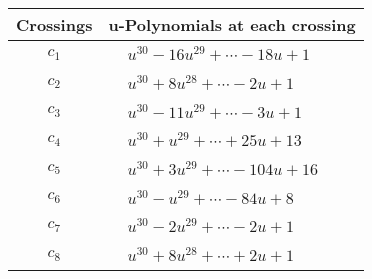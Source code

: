 \documentclass[1p]{elsarticle_modified}
\theoremstyle{definition}
\begin{document}
\begin{tabular}{m{50pt}|m{274pt}}
Crossings & \hspace{64pt}u-Polynomials at each crossing \\
\hline $$\begin{aligned}c_{1}\end{aligned}$$&$\begin{aligned}
&u^{30}-16 u^{29}+\cdots-18 u+1
\end{aligned}$\\
\hline $$\begin{aligned}c_{2}\end{aligned}$$&$\begin{aligned}
&u^{30}+8 u^{28}+\cdots-2 u+1
\end{aligned}$\\
\hline $$\begin{aligned}c_{3}\end{aligned}$$&$\begin{aligned}
&u^{30}-11 u^{29}+\cdots-3 u+1
\end{aligned}$\\
\hline $$\begin{aligned}c_{4}\end{aligned}$$&$\begin{aligned}
&u^{30}+u^{29}+\cdots+25 u+13
\end{aligned}$\\
\hline $$\begin{aligned}c_{5}\end{aligned}$$&$\begin{aligned}
&u^{30}+3 u^{29}+\cdots-104 u+16
\end{aligned}$\\
\hline $$\begin{aligned}c_{6}\end{aligned}$$&$\begin{aligned}
&u^{30}- u^{29}+\cdots-84 u+8
\end{aligned}$\\
\hline $$\begin{aligned}c_{7}\end{aligned}$$&$\begin{aligned}
&u^{30}-2 u^{29}+\cdots-2 u+1
\end{aligned}$\\
\hline $$\begin{aligned}c_{8}\end{aligned}$$&$\begin{aligned}
&u^{30}+8 u^{28}+\cdots+2 u+1
\end{aligned}$\\

\end{tabular}
\end{document}
